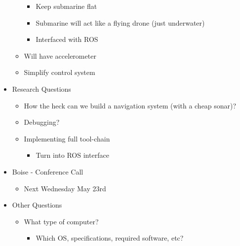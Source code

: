 \documentclass[12pt]{article}
\begin{document}
\begin{itemize}
\begin{itemize}
\begin{itemize}
						\item Keep submarine flat 
						\item Submarine will act like a flying drone (just underwater)
						\item Interfaced with ROS
					\end{itemize}
					\item Will have accelerometer
					\item Simplify control system
				\end{itemize}
				\item Research Questions
				\begin{itemize}
					\item How the heck can we build a navigation system (with a cheap sonar)?
					\item Debugging?
					\item Implementing full tool-chain
					\begin{itemize}
						\item Turn into ROS interface
					\end{itemize}
				\end{itemize}
				\item Boise - Conference Call
				\begin{itemize}
					\item Next Wednesday May 23rd
				\end{itemize}
				\item Other Questions
				\begin{itemize}
					\item What type of computer?
					\begin{itemize}
						\item Which OS, specifications, required software, etc?
					\end{itemize}
				\end{itemize}
				\begin{figure}[!htb]
					\centering

\end{figure}
\end{itemize}
\end{document}
